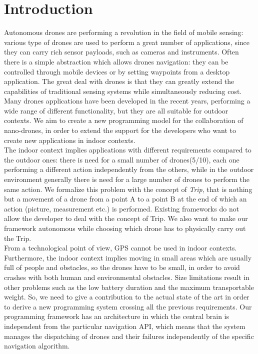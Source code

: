 \chapter{Introduction}
\label{cap1}

Autonomous drones are performing a revolution in the field of mobile sensing: various type of drones are used to perform a great number of applications, since they can carry rich sensor payloads, such as cameras and instruments.
Often there is a simple abstraction which allows drones navigation: they can be controlled through mobile devices or by setting waypoints from a desktop application.
The great deal with drones is that they can greatly extend the capabilities of traditional sensing systems while simultaneously reducing cost.
\\

Many drones applications have been developed in the recent years, performing a wide range of different functionality, but they are all suitable for outdoor contexts.
We aim to create a new programming model for the collaboration of nano-drones, in order to extend the support for the developers who want to create new applications in indoor contexts.
\\

The indoor context implies applications with different requirements compared to the outdoor ones:
there is need for a small number of drones(5/10), each one performing a different action independently from the others, while in the outdoor environment generally there is need for a large number of drones to perform the same action.
We formalize this problem with the concept of \textit{Trip}, that is nothing but a movement of a drone from a point A to a point B at the end of which an action (picture, measurement etc.) is performed.
Existing frameworks do not allow the developer to deal with the concept of Trip.
We also want to make our framework autonomous while choosing which drone has to physically carry out the Trip. 
\\

From a technological point of view, GPS cannot be used in indoor contexts.
Furthermore, the indoor context implies moving in small areas which are usually full of people and obstacles, so the drones have to be small, in order to avoid crashes with both human and environmental obstacles.
Size limitations result in other problems such as the low battery duration and the maximum transportable weight.
So, we need to give a contribution to the actual state of the art in order to derive a new programming system crossing all the previous requirements.
Our programming framework has an architecture in which the central brain is independent from the particular navigation API, which means that the system manages the dispatching of drones and their failures independently of the specific navigation algorithm.


